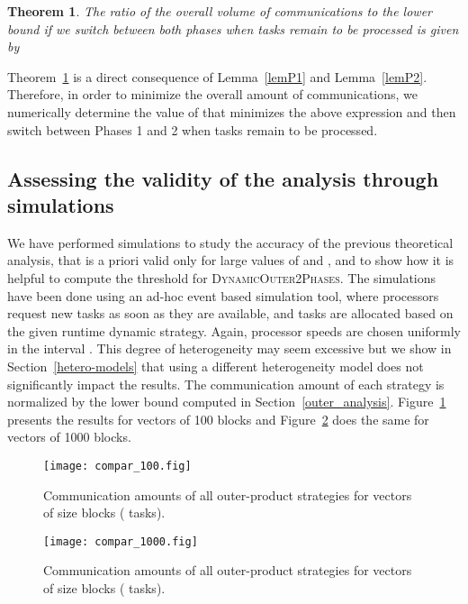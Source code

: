 \documentclass[a4paper,10pt]{article}
\newtheorem{theorem}{Theorem}
\newcommand{\stupidthreshold}{\textsc{Dynamic\-Outer\-2Phases}\xspace}
\begin{document}
\begin{theorem}
\label{mainthouter}
The ratio of the overall volume of communications to the lower bound if we switch between both phases when  tasks remain to be processed is given by 


\end{theorem}

Theorem~\ref{mainthouter} is a direct consequence of Lemma~\ref{lemP1}
and Lemma~\ref{lemP2}. Therefore, in order to minimize the overall
amount of communications, we numerically determine the value of
 that minimizes the above expression and then switch between
Phases 1 and 2 when  tasks remain to be processed.



\subsection{Assessing the validity of the analysis through simulations}
\label{simuouter}

We have performed simulations to study the accuracy of the previous
theoretical analysis, that is a priori valid only for large values of
 and , and to show how it is helpful to compute the threshold
for \stupidthreshold. The simulations have been done using an ad-hoc
event based simulation tool, where processors request new tasks as
soon as they are available, and tasks are allocated based on the given
runtime dynamic strategy. Again, processor speeds are chosen uniformly
in the interval .  This degree of heterogeneity may seem
excessive but we show in Section~\ref{hetero-models} that using a
different heterogeneity model does not significantly impact the
results.  The communication amount of each strategy is normalized by
the lower bound computed in
Section~\ref{outer_analysis}. Figure~\ref{fig.simubasicP100} presents
the results for vectors of 100 blocks and
Figure~\ref{fig.simubasicP1000} does the same for vectors of 1000
blocks.

\begin{figure}[htbp]
  \centering
  \texttt{[image: compar\_100.fig]}
  \caption{Communication amounts of all outer-product strategies for vectors of size  blocks ( tasks).}
  \label{fig.simubasicP100}
\end{figure}

\begin{figure}[htbp]
  \centering
  \texttt{[image: compar\_1000.fig]}
  \caption{Communication amounts of all outer-product strategies for vectors of size  blocks ( tasks).}
  \label{fig.simubasicP1000}
\end{figure}
\end{document}
